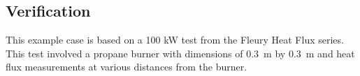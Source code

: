 \subsection*{Verification}

This example case is based on a 100 kW test from the Fleury Heat Flux series. This test involved a propane burner with dimensions of 0.3~m by 0.3~m and heat flux measurements at various distances from the burner.


